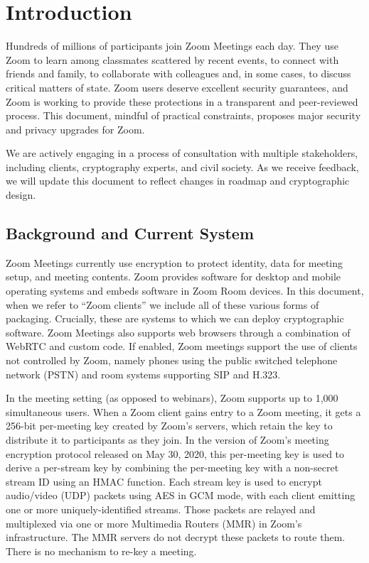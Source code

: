 \section{Introduction}
Hundreds of millions of participants join Zoom Meetings each day. They use Zoom to learn among classmates scattered by recent events, to connect with friends and family, to collaborate with colleagues and, in some cases, to discuss critical matters of state. Zoom users deserve excellent security guarantees, and Zoom is working to provide these protections in a transparent and peer-reviewed process. This document, mindful of practical constraints, proposes major security and privacy upgrades for Zoom.

We are actively engaging in a process of consultation with multiple stakeholders, including clients, cryptography experts, and civil society. As we receive feedback, we will update this document to reflect changes in roadmap and cryptographic design.

\subsection{Background and Current System}
Zoom Meetings currently use encryption to protect identity, data for meeting setup, and meeting contents. Zoom provides software for desktop and mobile operating systems and embeds software in Zoom Room devices. In this document, when we refer to ``Zoom clients'' we include all of these various forms of packaging. Crucially, these are systems to which we can deploy cryptographic software. Zoom Meetings also supports web browsers through a combination of WebRTC and custom code. If enabled, Zoom meetings support the use of clients not controlled by Zoom, namely phones using the public switched telephone network (PSTN) and room systems supporting SIP and H.323.

In the meeting setting (as opposed to webinars), Zoom supports up to 1,000 simultaneous users. When a Zoom client gains entry to a Zoom meeting, it gets a 256-bit per-meeting key created by Zoom's servers, which retain the key to distribute it to participants as they join. In the version of Zoom's meeting encryption protocol released on May 30, 2020, this per-meeting key is used to derive a per-stream key by combining the per-meeting key with a non-secret stream ID using an HMAC function. Each stream key is used to encrypt audio/video (UDP) packets using AES in GCM mode, with each client emitting one or more uniquely-identified streams. Those packets are relayed and multiplexed via one or more Multimedia Routers (MMR) in Zoom's infrastructure. The MMR servers do not decrypt these packets to route them. There is no mechanism to re-key a meeting.

